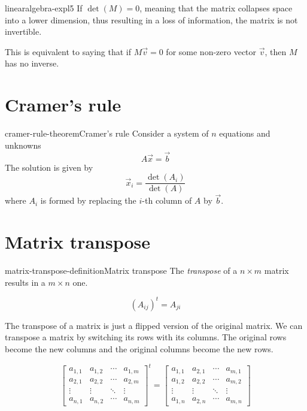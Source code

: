\documentclass[preview]{standalone}
\begin{document}

\begin{snippet}{linearalgebra-expl5}
If \(\det(M) = 0\), meaning that the matrix collapses space into a lower dimension,
thus resulting in a loss of information, the matrix is not invertible.

This is equivalent to saying that if \(M\vec{v}=0\) for some non-zero vector \(\vec{v}\),
then \(M\) has no inverse.
\end{snippet}


\section{Cramer's rule}

\begin{snippettheorem}{cramer-rule-theorem}{Cramer's rule}
    Consider a system of \(n\) equations and unknowns
    \[
        A\vec{x}=\vec{b}
    \]
    The solution is given by
    \[
        \vec{x}_i = \frac{\det(A_i)}{\det(A)}
    \]
    where \(A_i\) is formed by replacing the \(i\)-th column
    of \(A\) by \(\vec{b}\).
\end{snippettheorem}

\section{Matrix transpose}

\begin{snippetdefinition}{matrix-transpose-definition}{Matrix transpose}
    The \textit{transpose} of a \(n \times m\) matrix results in a \(m \times n\) one.

    \[
        {\left(A_{ij}\right)}^t=A_{ji}
    \]
    
    The transpose of a matrix is just a flipped version of the original matrix.
    We can transpose a matrix by switching its rows with its columns.
    The original rows become the new columns and the original columns become the new rows.
    
    \[
        {\begin{bmatrix} 
            a_{1,1} & a_{1,2} & \cdots & a_{1,m} \\
            a_{2,1} & a_{2,2} & \cdots & a_{2,m} \\
            \vdots  & \vdots  & \ddots & \vdots  \\
            a_{n,1} & a_{n,2} & \cdots & a_{n,m} 
        \end{bmatrix}}^t
        =
        \begin{bmatrix} 
            a_{1,1} & a_{2,1} & \cdots & a_{m,1} \\
            a_{1,2} & a_{2,2} & \cdots & a_{m,2} \\
            \vdots  & \vdots  & \ddots & \vdots  \\
            a_{1,n} & a_{2,n} & \cdots & a_{m,n} 
        \end{bmatrix}
    \]
\end{snippetdefinition}
\end{document}
